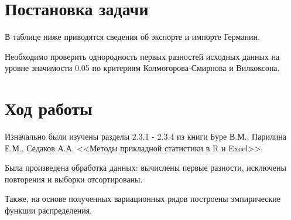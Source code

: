 \section{Постановка задачи}

В таблице ниже приводятся сведения об экспорте и импорте Германии.


Необходимо проверить однородность первых разностей исходных данных на уровне значимости 0.05 по критериям Колмогорова-Смирнова и Вилкоксона.

\section{Ход работы}

Изначально были изучены разделы 2.3.1 - 2.3.4 из книги Буре В.М., Парилина Е.М., Седаков А.А. <<Методы прикладной статистики в R и Excel>>.

Была произведена обработка данных: вычислены первые разности, исключены повторения и выборки отсортированы. 


Также, на основе полученных вариационных рядов построены эмпирические функции распределения.

